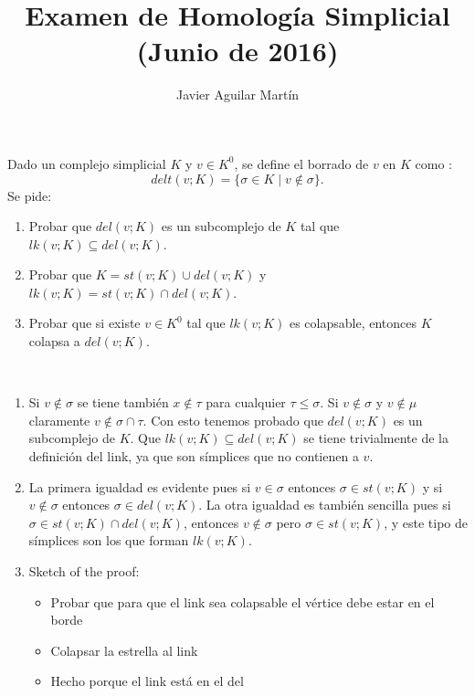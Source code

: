 \documentclass[twoside]{article}
\begin{document}
\title{Examen de Homología Simplicial (Junio de 2016)}
\author{Javier Aguilar Martín}
\maketitle

\begin{ejercicio}{1}
Dado un complejo simplicial $K$ y $v\in K^0$, se define el borrado de $v$ en $K$ como :
\[
delt(v;K)=\{\sigma\in K\mid v\notin\sigma\}.
\]
Se pide:
\begin{enumerate}
\item Probar que $del(v;K)$ es un subcomplejo de $K$ tal que $lk(v;K)\subseteq del(v;K)$.
\item Probar que $K=st(v;K)\cup del(v;K)$ y $lk(v;K)=st(v;K)\cap del(v;K)$.
\item Probar que si existe $v\in K^0$ tal que $lk(v;K)$ es colapsable, entonces $K$ colapsa a $del(v;K)$.
\end{enumerate}
\end{ejercicio}
\begin{solucion}\
\begin{enumerate}
\item Si $v\notin\sigma$ se tiene también $x\notin\tau$ para cualquier $\tau\leq\sigma$. Si $v\notin\sigma$ y $v\notin\mu$ claramente $v\notin \sigma\cap\tau$. Con esto tenemos probado que $del(v;K)$ es un subcomplejo de $K$. Que $lk(v;K)\subseteq del(v;K)$ se tiene trivialmente de la definición del link, ya que son símplices que no contienen a $v$.

\item La primera igualdad es evidente pues si $v\in \sigma$ entonces $\sigma\in st(v;K)$ y si $v\notin\sigma$ entonces $\sigma\in del(v;K)$. La otra igualdad es también sencilla pues si $\sigma\in st(v;K)\cap del(v;K)$, entonces $v\notin \sigma$ pero $\sigma\in st(v;K)$, y este tipo de símplices son los que forman $lk(v;K)$. 

\item Sketch of the proof:
\begin{itemize}
\item Probar que para que el link sea colapsable el vértice debe estar en el borde
\item Colapsar la estrella al link
\item Hecho porque el link está en el del
\end{itemize}
\end{enumerate}
\end{solucion}
\end{document}
